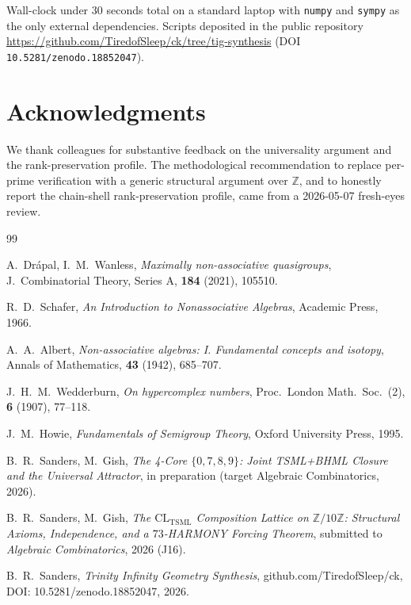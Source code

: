 \documentclass[11pt,reqno]{amsart}
\theoremstyle{plain}
\theoremstyle{definition}
\theoremstyle{remark}
\newcommand{\Z}{\mathbb{Z}}
\newcommand{\TSML}{\mathrm{TSML}}
\begin{document}
Wall-clock under $30$ seconds total on a standard laptop with
\texttt{numpy} and \texttt{sympy} as the only external dependencies.
Scripts deposited in the public repository
\url{https://github.com/TiredofSleep/ck/tree/tig-synthesis}
(DOI \texttt{10.5281/zenodo.18852047}).

\section*{Acknowledgments}
We thank colleagues for substantive feedback on the universality
argument and the rank-preservation profile. The methodological
recommendation to replace per-prime verification with a generic
structural argument over $\Z$, and to honestly report the
chain-shell rank-preservation profile, came from a 2026-05-07
fresh-eyes review.

\begin{thebibliography}{99}

A.~Drápal, I.~M.~Wanless,
\emph{Maximally non-associative quasigroups},
J.~Combinatorial Theory, Series A, \textbf{184} (2021), 105510.

R.~D.~Schafer,
\emph{An Introduction to Nonassociative Algebras},
Academic Press, 1966.

A.~A.~Albert,
\emph{Non-associative algebras: I. Fundamental concepts and isotopy},
Annals of Mathematics, \textbf{43} (1942), 685--707.

J.~H.~M.~Wedderburn,
\emph{On hypercomplex numbers},
Proc.~London Math.~Soc.~(2), \textbf{6} (1907), 77--118.

J.~M.~Howie,
\emph{Fundamentals of Semigroup Theory},
Oxford University Press, 1995.

B.~R.~Sanders, M.~Gish,
\emph{The 4-Core $\{0, 7, 8, 9\}$: Joint TSML+BHML Closure and the
Universal Attractor},
in preparation (target Algebraic Combinatorics, 2026).

B.~R.~Sanders, M.~Gish,
\emph{The $\mathrm{CL}_{\TSML}$ Composition Lattice on $\Z/10\Z$:
Structural Axioms, Independence, and a $73$-HARMONY Forcing
Theorem},
submitted to \emph{Algebraic Combinatorics}, 2026 (J16).

B.~R.~Sanders,
\emph{Trinity Infinity Geometry Synthesis},
github.com/TiredofSleep/ck, DOI: 10.5281/zenodo.18852047, 2026.

\end{thebibliography}
\end{document}
